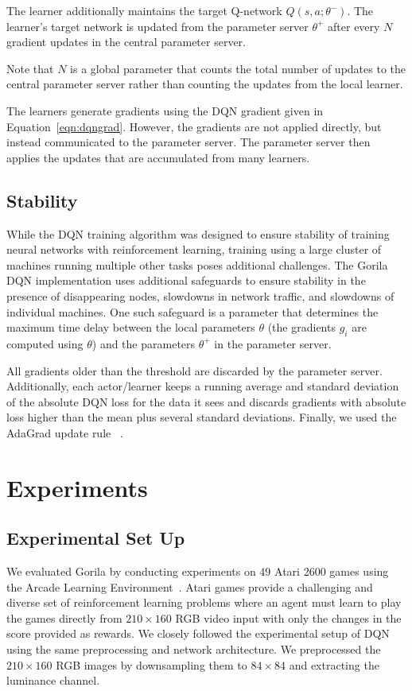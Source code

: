 \documentclass{article}
\begin{document}
The learner additionally maintains the target Q-network $Q(s,a;\theta^-)$.
The learner's target network is updated from the parameter server $\theta^+$ after every $N$ gradient updates in the central parameter server.

Note that $N$ is a global parameter that counts the total number of updates to the central parameter server rather than counting the updates from the local learner.

The learners generate gradients using the DQN gradient given in Equation~\ref{eqn:dqngrad}. However, the gradients are not applied directly, but instead communicated to the parameter server. The parameter server then applies the updates that are accumulated from many learners.

\subsection{Stability}
While the DQN training algorithm was designed to ensure stability of training neural networks with reinforcement learning, training using a large cluster of machines running multiple other tasks poses additional challenges.
The Gorila DQN implementation uses additional safeguards to ensure stability in the presence of disappearing nodes, slowdowns in network traffic, and slowdowns of individual machines.
One such safeguard is a parameter that determines the maximum time delay between the local parameters $\theta$ (the gradients $g_i$ are computed using $\theta$) and the parameters $\theta^+$ in the parameter server.

All gradients older than the threshold are discarded by the parameter server.  Additionally, each actor/learner keeps a running average and standard deviation of the absolute DQN loss for the data it sees and discards gradients with absolute loss higher than the mean plus several standard deviations.  Finally, we used the AdaGrad update rule ~\cite{duchi2011adaptive}.


 \section{Experiments}
\subsection{Experimental Set Up}
We evaluated Gorila by conducting experiments on 49 Atari 2600 games using the Arcade Learning Environment~\cite{bellemare-ale}.
Atari games provide a challenging and diverse set of reinforcement learning problems where an agent must learn to play the games directly from $210\times 160$ RGB video input with only the changes in the score provided as rewards.
We closely followed the experimental setup of DQN~\cite{mnih-dqn-2015} using the same preprocessing and network architecture.
We preprocessed the $210\times 160$ RGB images by downsampling them to $84\times 84$ and extracting the luminance channel.
\end{document}
